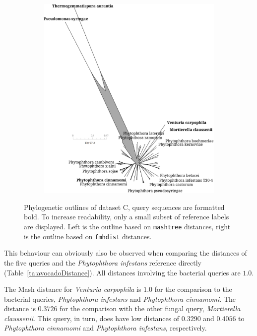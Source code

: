 \begin{figure}
\begin{subfigure}{0.49\textwidth}
  \end{subfigure}
  \begin{subfigure}{0.49\textwidth}
    \includegraphics[width=1.0\textwidth]{figures/fmhdist_avocado4-1_k21_s2000.png}
  \end{subfigure}
  \caption{Phylogenetic outlines of dataset C, query sequences are formatted
  bold. To increase readability, only a small subset of reference labels are
  displayed. Left is the outline based on \texttt{mashtree} distances, right is
  the outline based on \texttt{fmhdist} distances.}
  \label{fig:avocadoOutlineComparison}
\end{figure}

This behaviour can obviously also be observed when comparing the distances of
the five queries and the \textit{Phytophthora infestans} reference directly
(Table~\ref{ta:avocadoDistance}). All distances involving the bacterial queries
are $1.0$.

The Mash distance for \textit{Venturia carpophila} is $1.0$ for the comparison
to the bacterial queries, \textit{Phytophthora infestans} and
\textit{Phytophthora cinnamomi}. The distance is $0.3726$ for the comparison
with the other fungal query, \textit{Mortierella claussenii}. This query, in
turn, does have low distances of $0.3290$ and $0.4056$ to \textit{Phytophthora
cinnamomi} and \textit{Phytophthora infestans}, respectively.

